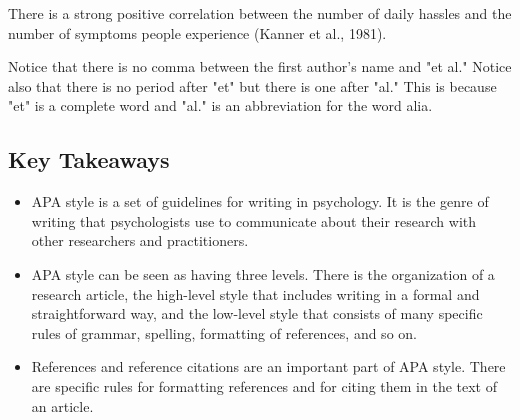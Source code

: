 \begin{kframe}
There is a strong positive correlation between the number of daily hassles and the number of symptoms people experience (Kanner et al., 1981).
\end{kframe}

Notice that there is no comma between the first author's name and "et al." Notice also that there is no period after "et" but there is one after "al." This is because "et" is a complete word and "al." is an abbreviation for the word alia.


\subsection{Key Takeaways}
\begin{fullwidth}
\begin{itemize}
\item APA style is a set of guidelines for writing in psychology. It is the genre of writing that psychologists use to communicate about their research with other researchers and practitioners.

\item APA style can be seen as having three levels. There is the organization of a research article, the
high-level style that includes writing in a formal and straightforward way, and the low-level style
that consists of many specific rules of grammar, spelling, formatting of references, and so on.

\item References and reference citations are an important part of APA style. There are specific rules for
formatting references and for citing them in the text of an article.

\end{itemize}
\end{fullwidth}



